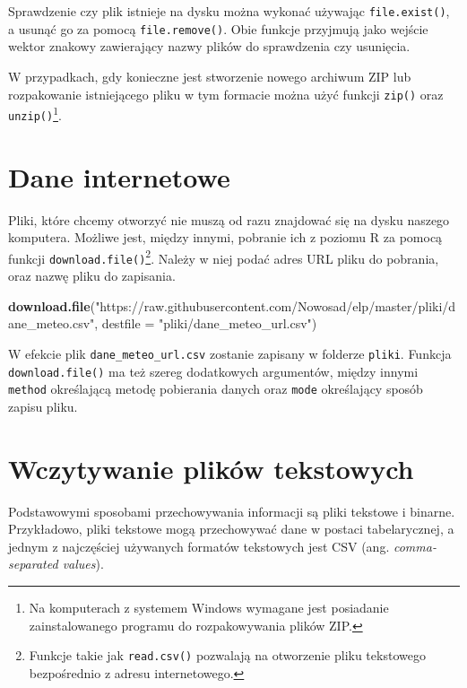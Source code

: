 \documentclass[paper=6in:9in,pagesize=pdftex,headinclude=on,footinclude=on,10pt]{scrbook}
\newenvironment{Shaded}{\begin{snugshade}}{\end{snugshade}}
\newcommand{\DataTypeTok}[1]{\textcolor[rgb]{0.13,0.29,0.53}{#1}}
\newcommand{\KeywordTok}[1]{\textcolor[rgb]{0.13,0.29,0.53}{\textbf{#1}}}
\newcommand{\NormalTok}[1]{#1}
\newcommand{\StringTok}[1]{\textcolor[rgb]{0.31,0.60,0.02}{#1}}
\begin{document}
Sprawdzenie czy plik istnieje na dysku można wykonać używając \texttt{file.exist()}, a usunąć go za pomocą \texttt{file.remove()}.
Obie funkcje przyjmują jako wejście wektor znakowy zawierający nazwy plików do sprawdzenia czy usunięcia.

W przypadkach, gdy konieczne jest stworzenie nowego archiwum ZIP lub rozpakowanie istniejącego pliku w tym formacie można użyć funkcji \texttt{zip()} oraz \texttt{unzip()}\footnote{Na komputerach z systemem Windows wymagane jest posiadanie zainstalowanego programu do rozpakowywania plików ZIP.}.

\hypertarget{dane-internetowe}{%
\section{Dane internetowe}\label{dane-internetowe}}

Pliki, które chcemy otworzyć nie muszą od razu znajdować się na dysku naszego komputera.
Możliwe jest, między innymi, pobranie ich z poziomu R za pomocą funkcji \texttt{download.file()}\footnote{Funkcje takie jak \texttt{read.csv()} pozwalają na otworzenie pliku tekstowego bezpośrednio z adresu internetowego.}.
Należy w niej podać adres URL pliku do pobrania, oraz nazwę pliku do zapisania.

\begin{Shaded}
\begin{Highlighting}[]
\KeywordTok{download.file}\NormalTok{(}\StringTok{"https://raw.githubusercontent.com/Nowosad/elp/master/pliki/dane_meteo.csv"}\NormalTok{, }
              \DataTypeTok{destfile =} \StringTok{"pliki/dane_meteo_url.csv"}\NormalTok{)}
\end{Highlighting}
\end{Shaded}

W efekcie plik \texttt{dane\_meteo\_url.csv} zostanie zapisany w folderze \texttt{pliki}.
Funkcja \texttt{download.file()} ma też szereg dodatkowych argumentów, między innymi \texttt{method} określającą metodę pobierania danych oraz \texttt{mode} określający sposób zapisu pliku.

\hypertarget{wczytywanie-plikow-tekstowych}{%
\section{Wczytywanie plików tekstowych}\label{wczytywanie-plikow-tekstowych}}

Podstawowymi sposobami przechowywania informacji są pliki tekstowe i binarne.
Przykładowo, pliki tekstowe mogą przechowywać dane w postaci tabelarycznej, a jednym z najczęściej używanych formatów tekstowych jest CSV (ang. \emph{comma-separated values}).
\end{document}
